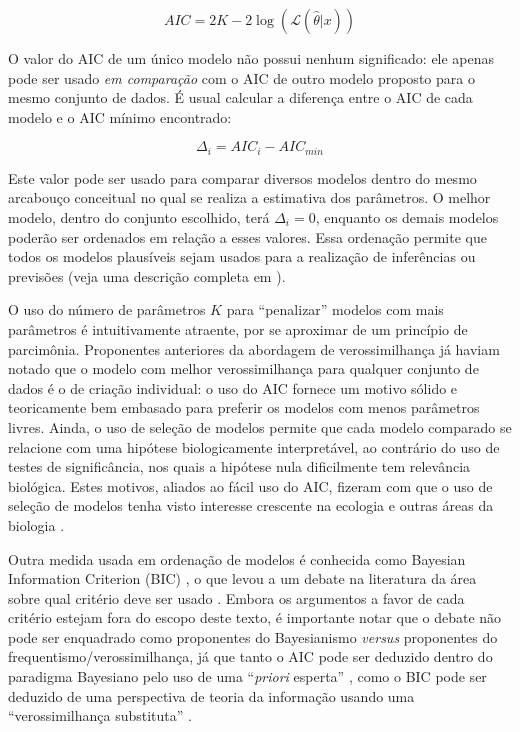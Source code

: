 \begin{equation}
AIC = 2K - 2\log(\mathcal{L}(\hat\theta|x))
\end{equation}

O valor do AIC de um único modelo não possui nenhum significado: ele apenas pode ser usado {\em em comparação}
com o AIC de outro modelo proposto para o mesmo conjunto de dados. É usual calcular a diferença entre o AIC de cada
modelo e o AIC mínimo encontrado:

\begin{equation}
\Delta_i = AIC_i - AIC_{min}
\end{equation}

Este valor pode ser usado para comparar diversos modelos dentro do mesmo arcabouço conceitual no qual se realiza a
estimativa dos parâmetros. O melhor modelo, dentro do conjunto escolhido, terá $\Delta_i = 0$, enquanto os demais
modelos poderão ser ordenados em relação a esses valores. Essa ordenação permite que todos os modelos plausíveis
sejam usados para a realização de inferências ou previsões (veja uma descrição completa em \citep{Burnham02}).

O uso do número de parâmetros $K$ para ``penalizar'' modelos com mais parâmetros é intuitivamente atraente, por
se aproximar de um princípio de parcimônia. Proponentes anteriores da abordagem de verossimilhança já haviam notado
que o modelo com melhor verossimilhança para qualquer conjunto de dados é o de criação individual: o uso do AIC
fornece um motivo sólido e teoricamente bem embasado para preferir os modelos com menos parâmetros livres.
Ainda, o uso de seleção de modelos permite que cada modelo comparado se relacione com uma hipótese biologicamente
interpretável, ao contrário do uso de testes de significância, nos quais a hipótese nula dificilmente tem relevância
biológica. Estes motivos, aliados ao fácil uso do AIC, fizeram com que o uso de seleção de modelos tenha
visto interesse crescente na ecologia e outras áreas da biologia \citep{Johnson04}.

Outra medida usada em ordenação de modelos é conhecida como Bayesian Information Criterion (BIC) \citep{Schwarz78},
o que levou a um debate na literatura da área sobre qual critério deve ser usado \citep{Weakliem99}. Embora os
argumentos a favor de cada critério estejam fora do escopo deste texto, é importante notar que o debate não pode
ser enquadrado como proponentes do Bayesianismo {\em versus} proponentes do frequentismo/verossimilhança, já que
tanto o AIC pode ser deduzido dentro do paradigma Bayesiano pelo uso de uma ``{\em priori} esperta'' 
\citep{Burnham04}, como o BIC pode ser deduzido de uma perspectiva de teoria da informação usando uma 
``verossimilhança substituta'' \citep{Stoica04}.

